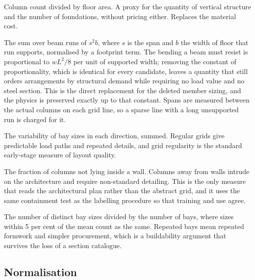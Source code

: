 \begin{description}[style=unboxed,leftmargin=0pt]
\item[Density, $t_\mathrm{density}$.] Column count divided by floor area.
A proxy for the quantity of vertical structure and the number of
foundations, without pricing either. Replaces the material cost.

\item[Span demand, $t_\mathrm{span}$.] The sum over beam runs of
$s^2 b$, where $s$ is the span and $b$ the width of floor that run
supports, normalised by a footprint term. The bending a beam must resist
is proportional to $wL^2/8$ per unit of supported width; removing the
constant of proportionality, which is identical for every candidate,
leaves a quantity that still orders arrangements by structural demand
while requiring no load value and no steel section. This is the direct
replacement for the deleted member sizing, and the physics is preserved
exactly up to that constant. Spans are measured between the actual columns
on each grid line, so a sparse line with a long unsupported run is charged
for it.

\item[Irregularity, $t_\mathrm{irreg}$.] The variability of bay sizes in
each direction, summed. Regular grids give predictable load paths and
repeated details, and grid regularity is the standard early-stage measure
of layout quality.

\item[Off-wall fraction, $t_\mathrm{offwall}$.] The fraction of columns
not lying inside a wall. Columns away from walls intrude on the
architecture and require non-standard detailing. This is the only measure
that reads the architectural plan rather than the abstract grid, and it
uses the same containment test as the labelling procedure so that training
and use agree.

\item[Repetition, $t_\mathrm{rep}$.] The number of distinct bay sizes
divided by the number of bays, where sizes within 5 per cent of the mean
count as the same. Repeated bays mean repeated formwork and simpler
procurement, which is a buildability argument that survives the loss of a
section catalogue.
\end{description}

\subsection{Normalisation}

